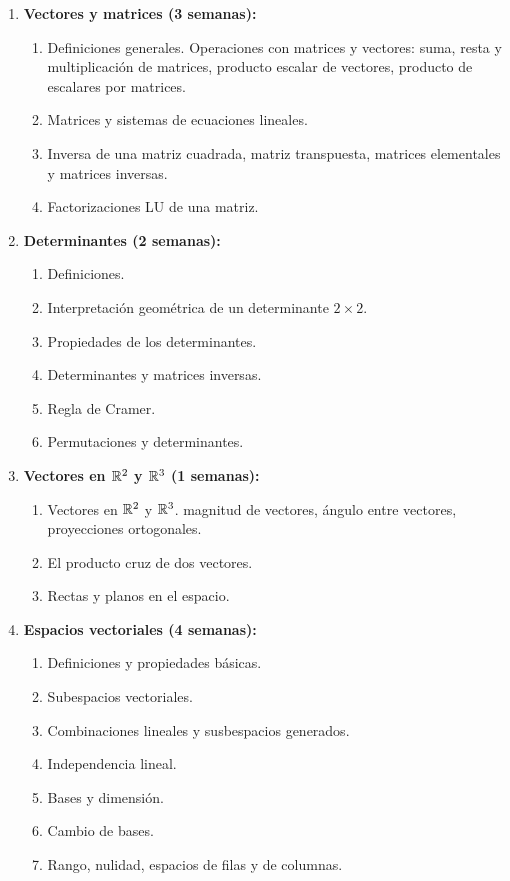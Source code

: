 \begin{refsection}
\begin{enumerate}
\item \textbf{Vectores y matrices (3 semanas):} 
\begin{enumerate}
    \item Definiciones generales. Operaciones con matrices y vectores: suma, resta y multiplicación de matrices, producto escalar de vectores, producto de escalares por matrices.
    \item Matrices y sistemas de ecuaciones lineales.
    \item Inversa de una matriz cuadrada, matriz transpuesta, matrices elementales y matrices inversas.
    \item Factorizaciones LU de una matriz.
\end{enumerate}

\item \textbf{Determinantes (2 semanas):} 
\begin{enumerate}
    \item Definiciones.
    \item Interpretación geométrica de un determinante $2 \times 2$.
    \item Propiedades de los determinantes.
    \item Determinantes y matrices inversas.
    \item Regla de Cramer.
    \item Permutaciones y determinantes.
\end{enumerate}

\item \textbf{Vectores en $\mathbb{R}^2$ y $\mathbb{R}^3$ (1 semanas):} 
\begin{enumerate}
    \item Vectores en $\mathbb{R}^2$ y $\mathbb{R}^3$. magnitud de vectores, ángulo entre vectores, proyecciones ortogonales.
    \item El producto cruz de dos vectores.
    \item Rectas y planos en el espacio.
\end{enumerate}

\item \textbf{Espacios vectoriales (4 semanas):} 
\begin{enumerate}
    \item Definiciones y propiedades básicas.
    \item Subespacios vectoriales.
    \item Combinaciones lineales y susbespacios generados.
    \item Independencia lineal.
    \item Bases y dimensión.
    \item Cambio de bases.
    \item Rango, nulidad, espacios de filas y de columnas.
\end{enumerate}


\end{enumerate}
\end{refsection}
